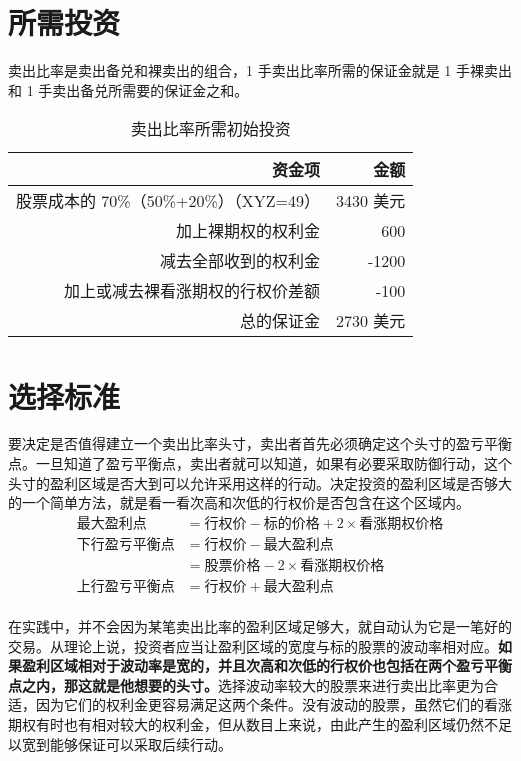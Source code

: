 \section{所需投资}
卖出比率是卖出备兑和裸卖出的组合，1 手卖出比率所需的保证金就是 1 手裸卖出和 1 手卖出备兑所需要的保证金之和。
\begin{table}
    \centering
    \caption{卖出比率所需初始投资}
    \begin{tabular}{rr}
        \hline
        资金项                           & 金额      \\
        \hline
        股票成本的 70\%（50\%+20\%）（XYZ=49） & 3430 美元 \\
        加上裸期权的权利金                     & 600     \\
        减去全部收到的权利金                    & -1200   \\
        加上或减去裸看涨期权的行权价差额              & -100    \\
        总的保证金                         & 2730 美元 \\
        \hline
    \end{tabular}
\end{table}
\section{选择标准}
要决定是否值得建立一个卖出比率头寸，卖出者首先必须确定这个头寸的盈亏平衡点。一旦知道了盈亏平衡点，卖出者就可以知道，如果有必要采取防御行动，这个头寸的盈利区域是否大到可以允许采用这样的行动。决定投资的盈利区域是否够大的一个简单方法，就是看一看次高和次低的行权价是否包含在这个区域内。
\begin{equation}
    \begin{aligned}
        \text{最大盈利点}   & =\text{行权价}-\text{标的价格}+2\times \text{看涨期权价格} \\
        \text{下行盈亏平衡点} & =\text{行权价}-\text{最大盈利点}                      \\
                       & =\text{股票价格}-2\times \text{看涨期权价格}            \\
        \text{上行盈亏平衡点} & =\text{行权价}+\text{最大盈利点}                      \\
    \end{aligned}
\end{equation}

在实践中，并不会因为某笔卖出比率的盈利区域足够大，就自动认为它是一笔好的交易。从理论上说，投资者应当让盈利区域的宽度与标的股票的波动率相对应。\textbf{如果盈利区域相对于波动率是宽的，并且次高和次低的行权价也包括在两个盈亏平衡点之内，那这就是他想要的头寸。}选择波动率较大的股票来进行卖出比率更为合适，因为它们的权利金更容易满足这两个条件。没有波动的股票，虽然它们的看涨期权有时也有相对较大的权利金，但从数目上来说，由此产生的盈利区域仍然不足以宽到能够保证可以采取后续行动。

